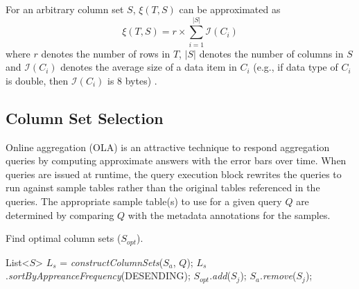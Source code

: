 \documentclass{sig-alternate-05-2015}
\begin{document}
For an arbitrary column set $S$, $\xi(T, S)$ can be approximated as
\begin{equation}
\xi(T, S) = r \times \sum_{i=1}^{|S|} \mathcal{I}(C_i)
\end{equation}
where $r$ denotes the number of rows in $T$, 
$|S|$ denotes the number of columns in $S$ 
and $\mathcal{I}(C_i)$ denotes the average size of a data item in $C_i$ 
(e.g., if data type of $C_i$ is double, then $\mathcal{I}(C_i)$ is 8 bytes) .




\subsection{Column Set Selection}
Online aggregation (OLA) is an attractive technique to respond aggregation queries by computing approximate answers with the error bars over time.
When queries are issued at runtime, the query execution block rewrites the queries to run against sample tables rather than the original tables referenced in the queries.
The appropriate sample table(s) to use for a given query $Q$ are determined by comparing $Q$ with the metadata annotations for the samples.
\begin{algorithm}
\caption{Find optimal column sets ($S_{opt}$).}
\label{algo:columnset}
\begin{algorithmic}[1]
	\State List<$S$> $L_{s}$ = \textit{constructColumnSets}($S_a$, $Q$);
	\State $L_{s}$.\textit{sortByAppreanceFrequency}(DESENDING);
	\Return
	\Else 	
	\State $S_{opt}$.\textit{add}($S_j$); 
	\State $S_a$.\textit{remove}($S_j$); 
	\EndIf
	\EndFor
	\EndProcedure
\end{algorithmic}
\end{algorithm}

\end{document}
